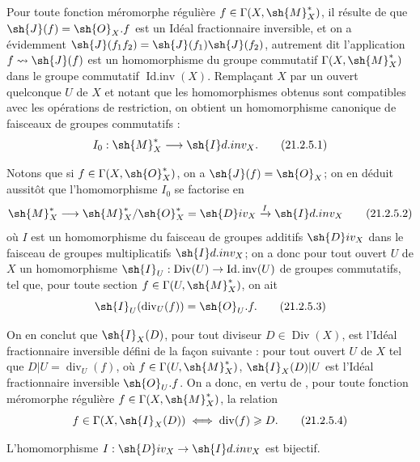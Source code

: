 \begin{env}[21.2.5]
\label{IV.21.2.5}
Pour toute fonction méromorphe régulière $f\in\Gamma(X,\sh{M}_X^*)$, il résulte de  que $\sh{J}(f)=\sh{O}_X.f$ est un Idéal fractionnaire inversible, et on a évidemment $\sh{J}(f_1f_2)=\sh{J}(f_1)\sh{J}(f_2)$, autrement dit l'application $f\leadsto\sh{J}(f)$ est un homomorphisme du groupe commutatif $\Gamma(X,\sh{M}_X^*)$ dans le groupe commutatif $\operatorname{Id.inv}(X)$.
Remplaçant $X$ par un ouvert quelconque $U$ de $X$ et notant que les homomorphismes obtenus sont compatibles avec les opérations de restriction, on obtient un homomorphisme canonique de faisceaux de groupes commutatifs :
\[
\label{IV.21.2.5.1}
  I_0:\sh{M}_X^*\to\sh{I}d.inv_X.
  \tag{21.2.5.1}
\]

Notons que si $f\in\Gamma(X,\sh{O}_X^*)$, on a $\sh{J}(f)=\sh{O}_X$;
on en déduit aussitôt que l'homomorphisme $I_0$ se factorise en
\[
\label{IV.21.2.5.2}
  \sh{M}_X^*\to\sh{M}_X^*/\sh{O}_X^*=\sh{D}iv_X\xrightarrow{I}\sh{I}d.inv_X
  \tag{21.2.5.2}
\]
où $I$ est un homomorphisme du faisceau de groupes additifs $\sh{D}iv_X$ dans le faisceau de groupes multiplicatifs $\sh{I}d.inv_X$;
on a donc pour tout ouvert $U$ de $X$ un homomorphisme $\sh{I}_U:\operatorname{Div}(U)\to\operatorname{Id.inv}(U)$ de groupes commutatifs, tel que, pour toute section $f\in\Gamma(U,\sh{M}_X^*)$, on ait
\[
\label{IV.21.2.5.3}
  \sh{I}_U(\operatorname{div}_U(f))=\sh{O}_U.f.
  \tag{21.2.5.3}
\]


On en conclut que $\sh{I}_X(D)$, pour tout diviseur $D\in\operatorname{Div}(X)$, est l'Idéal fractionnaire inversible défini de la façon suivante : pour tout ouvert $U$ de $X$ tel que $D|U=\operatorname{div}_U(f)$, où $f\in\Gamma(U,\sh{M}_X^*)$, $\sh{I}_X(D)|U$ est l'Idéal fractionnaire inversible $\sh{O}_U.f$.
On a donc, en vertu de , pour toute fonction méromorphe régulière $f\in\Gamma(X,\sh{M}_X^*)$, la relation
\[
\label{IV.21.2.5.4}
  f\in\Gamma(X,\sh{I}_X(D)) \iff \operatorname{div}(f)\geq D.
  \tag{21.2.5.4}
\]
\end{env}

\begin{proposition}[21.2.6]
\label{IV.21.2.6}
L'homomorphisme $I:\sh{D}iv_X\to\sh{I}d.inv_X$ est bijectif.
\end{proposition}

